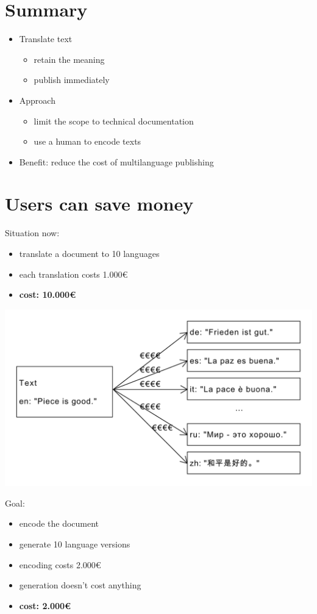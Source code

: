\documentclass{article}
\begin{document}
\section{Summary}
\begin{itemize}
\item Translate text
  \begin{itemize}
  \item retain the meaning
  \item publish immediately
  \end{itemize}
\item Approach
  \begin{itemize}
  \item limit the scope to technical documentation
  \item use a human to encode texts
  \end{itemize}
\item Benefit: reduce the cost of multilanguage publishing
\end{itemize}

\section{Users can save money}

Situation now:
\begin{itemize}
\item translate a document to 10 languages
\item each translation costs 1.000€
\item \textbf{cost: 10.000€}
\end{itemize}

\includegraphics[scale=0.4]{dia/user-view-current-world.pdf}

Goal:
\begin{itemize}
\item encode the document
\item generate 10 language versions
\item encoding costs 2.000€
\item generation doesn't cost anything
\item \textbf{cost: 2.000€}
\end{itemize}
\end{document}
